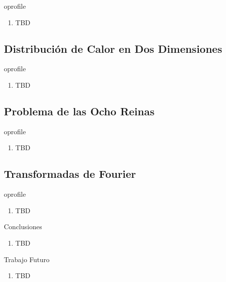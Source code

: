 \documentclass{beamer}
\begin{document}
\begin{frame}{oprofile}
	\begin{enumerate}
	\item TBD 
	\end{enumerate}
\end{frame}

\subsection{Distribución de Calor en Dos Dimensiones}

\begin{frame}{oprofile}
	\begin{enumerate}
	\item TBD 
	\end{enumerate}
\end{frame}

\subsection{Problema de las Ocho Reinas}

\begin{frame}{oprofile}
	\begin{enumerate}
	\item TBD 
	\end{enumerate}
\end{frame}

\subsection{Transformadas de Fourier}

\begin{frame}{oprofile}
	\begin{enumerate}
	\item TBD 
	\end{enumerate}
\end{frame}

\begin{frame}{Conclusiones}
	\begin{enumerate}
	\item TBD 
	\end{enumerate}
\end{frame}

\begin{frame}{Trabajo Futuro}
	\begin{enumerate}
	\item TBD 
	\end{enumerate}
\end{frame}
\end{document}
